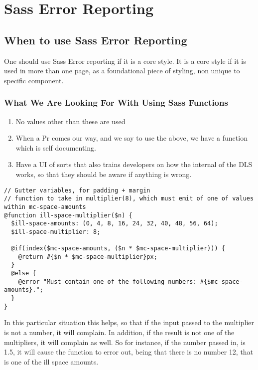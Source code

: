 \maketitle{}
\section{ Sass Error Reporting }

\subsection{ When to use Sass Error Reporting }
One should use Sass Error reporting if it is a core style. It is a core style if
it is used in more than one page, as a foundational piece of styling, non
unique to specific component.

\subsubsection{ What We Are Looking For With Using Sass Functions }
\begin{enumerate}
  \item No values other than these are used
  \item When a Pr comes our way, and we say to use the above, we have a function which is self documenting.
  \item Have a UI of sorts that also trains developers on how the internal of
  the DLS works, so that they should be aware if anything is wrong.
\end{enumerate}

\begin{lstlisting}
// Gutter variables, for padding + margin
// function to take in multiplier(8), which must emit of one of values within mc-space-amounts
@function ill-space-multiplier($n) {
  $ill-space-amounts: (0, 4, 8, 16, 24, 32, 40, 48, 56, 64);
  $ill-space-multiplier: 8;

  @if(index($mc-space-amounts, ($n * $mc-space-multiplier))) {
    @return #{$n * $mc-space-multiplier}px;
  }
  @else {
    @error "Must contain one of the following numbers: #{$mc-space-amounts}.";
  }
}
\end{lstlisting}

In this particular situation this helps, so that if the input passed to the
multiplier is not a number, it will complain. In addition, if the result is not
one of the multipliers, it will complain as well. So for instance, if the number
passed in, is 1.5, it will cause the function to error out, being that there is
no number 12, that is one of the ill space amounts.
